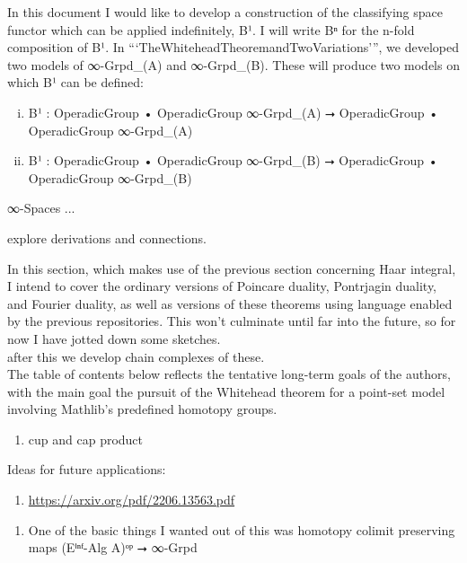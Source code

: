 \documentclass{book}
\theoremstyle{definition}
\begin{document}
In this document I would like to develop a construction of the classifying space functor which can be applied indefinitely, B¹. I will write Bⁿ for the n-fold composition of B¹. In ```TheWhiteheadTheoremandTwoVariations''', we developed two models of ∞-Grpd\_(A) and ∞-Grpd\_(B). These will produce two models on which B¹ can be defined:

\begin{enumerate}[(i)]
\item B¹ : OperadicGroup • OperadicGroup ∞-Grpd\_(A) ⭢ OperadicGroup • OperadicGroup ∞-Grpd\_(A)
\item B¹ : OperadicGroup • OperadicGroup ∞-Grpd\_(B) ⭢ OperadicGroup • OperadicGroup ∞-Grpd\_(B)
\end{enumerate} 

∞-Spaces ...

explore derivations and connections.

In this section, which makes use of the previous section concerning Haar integral, I intend to cover the ordinary versions of Poincare duality, Pontrjagin duality, and Fourier duality, as well as versions of these theorems using language enabled by the previous repositories. This won't culminate until far into the future, so for now I have jotted down some sketches.\\

after this we develop chain complexes of these.\\

The table of contents below reflects the tentative long-term goals of the authors, with the main goal the pursuit of the Whitehead theorem for a point-set model involving Mathlib's predefined homotopy groups.\\

\begin{enumerate}
\item cup and cap product
\end{enumerate}

Ideas for future applications:

\begin{enumerate}
\item \url{https://arxiv.org/pdf/2206.13563.pdf}
\end{enumerate}

\begin{enumerate}
\item One of the basic things I wanted out of this was homotopy colimit preserving maps (Eⁱⁿᶠ-Alg A)ᵒᵖ ⭢ ∞-Grpd
\end{enumerate}
\end{document}
